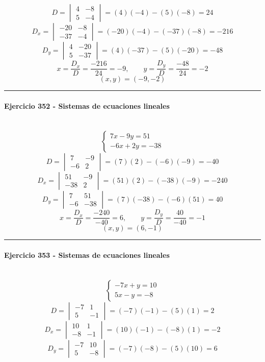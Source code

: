 \documentclass[10pt,a4paper]{article}
\newcommand{\res}[1]{\paragraph{#1}\mbox{}\\[-1.2em]}
\begin{document}
\[ D=\begin{vmatrix}4&-8\\5&-4\end{vmatrix}=(4)(-4)-(5)(-8)=24 \]
\[ D_x=\begin{vmatrix}-20&-8\\-37&-4\end{vmatrix}=(-20)(-4)-(-37)(-8)=-216 \]
\[ D_y=\begin{vmatrix}4&-20\\5&-37\end{vmatrix}=(4)(-37)-(5)(-20)=-48 \]
\[ x=\frac{D_x}{D}=\frac{-216}{24}=-9,\qquad y=\frac{D_y}{D}=\frac{-48}{24}=-2 \]
\[ \boxed{(x,y)=(-9,-2)} \]
\vspace{1mm}\hrule\vspace{2mm}
\res{Ejercicio 352 - Sistemas de ecuaciones lineales}
\[ \begin{cases}7 x - 9 y=51\\- 6 x + 2 y=-38\end{cases} \]
\[ D=\begin{vmatrix}7&-9\\-6&2\end{vmatrix}=(7)(2)-(-6)(-9)=-40 \]
\[ D_x=\begin{vmatrix}51&-9\\-38&2\end{vmatrix}=(51)(2)-(-38)(-9)=-240 \]
\[ D_y=\begin{vmatrix}7&51\\-6&-38\end{vmatrix}=(7)(-38)-(-6)(51)=40 \]
\[ x=\frac{D_x}{D}=\frac{-240}{-40}=6,\qquad y=\frac{D_y}{D}=\frac{40}{-40}=-1 \]
\[ \boxed{(x,y)=(6,-1)} \]
\vspace{1mm}\hrule\vspace{2mm}
\res{Ejercicio 353 - Sistemas de ecuaciones lineales}
\[ \begin{cases}- 7 x + y=10\\5 x - y=-8\end{cases} \]
\[ D=\begin{vmatrix}-7&1\\5&-1\end{vmatrix}=(-7)(-1)-(5)(1)=2 \]
\[ D_x=\begin{vmatrix}10&1\\-8&-1\end{vmatrix}=(10)(-1)-(-8)(1)=-2 \]
\[ D_y=\begin{vmatrix}-7&10\\5&-8\end{vmatrix}=(-7)(-8)-(5)(10)=6 \]
\end{document}
